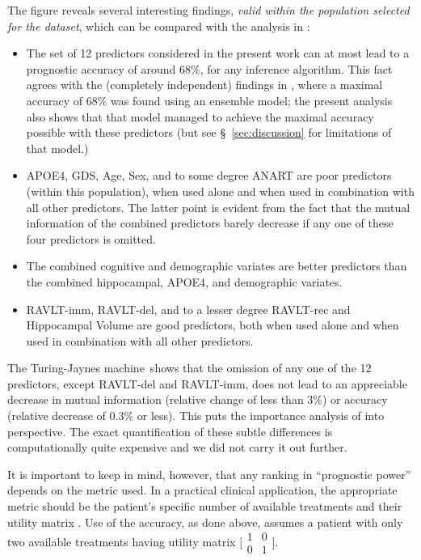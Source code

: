 \documentclass[utf8]{FrontiersinHarvard} %
\newcommand*{\sect}{\S}%
\renewcommand*{\|}[1][]{\nonscript\:#1\vert\nonscript\:\mathopen{}}
\newcommand*{\tjm}{Turing-Jaynes machine}
\begin{document}
The figure reveals several interesting findings, \emph{valid within the population selected for the dataset}, which can be compared with the analysis in  \cite[see especially Fig.~3 and Table~3]{ryeetal2022}:
\begin{itemize}
\item The set of 12 predictors considered in the present work \citep[and in ][]{ryeetal2022} can at most lead to a prognostic accuracy of around 68\%, for any inference algorithm. This fact agrees with the (completely independent) findings in \cite{ryeetal2022}, where a maximal accuracy of 68\% was found using an ensemble model; the present analysis also shows that that model managed to achieve the maximal accuracy possible with these predictors (but see \sect~\ref{sec:discussion} for limitations of that model.)
\item \textsf{APOE4}, \textsf{GDS}, \textsf{Age}, \textsf{Sex}, and to some degree \textsf{ANART} are poor predictors (within this population), when used alone and when used in combination with all other predictors. The latter point is evident from the fact that the mutual information of the combined predictors barely decrease if any one of these four predictors is omitted.
\item The combined cognitive and demographic variates are better predictors than the combined hippocampal, \textsf{APOE4}, and demographic variates.
\item \textsf{RAVLT-imm}, \textsf{RAVLT-del}, and to a lesser degree \textsf{RAVLT-rec} and Hippocampal Volume \citep[contrast this with]{ryeetal2022} are good predictors, both when used alone and when used in combination with all other predictors.
\end{itemize}

The \tjm\ shows that the omission of any one of the 12 predictors, except \textsf{RAVLT-del} and \textsf{RAVLT-imm}, does not lead to an appreciable decrease in mutual information (relative change of less than 3\%) or accuracy (relative decrease of 0.3\% or less). This puts the importance analysis of \citealp{ryeetal2022} into perspective. The exact quantification of these subtle differences is computationally quite expensive and we did not carry it out further.

It is important to keep in mind, however, that any ranking in \enquote{prognostic power} depends on the metric used. In a practical clinical application, the appropriate metric should be the patient's specific number of available treatments and their utility matrix \citep{dyrlandetal2022}. Use of the accuracy, as done above, assumes a patient with only two available treatments having utility matrix $\bigl[\begin{smallmatrix}1&0\\0&1\end{smallmatrix}\bigr]$.
\end{document}
